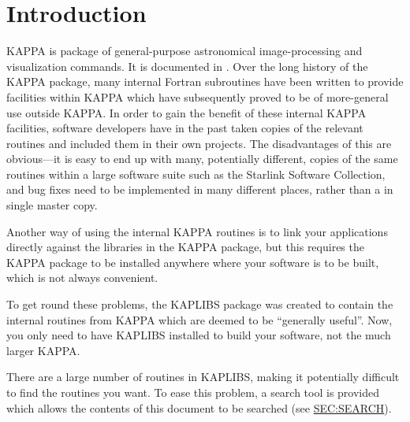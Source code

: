 \stardocabstract
 \newpage
 \begin{latexonly}
   \setlength{\parskip}{0mm}
   \latexonlytoc
   \setlength{\parskip}{\medskipamount}
   \markright{\stardocname}
 \end{latexonly}
\cleardoublepage
\renewcommand{\thepage}{\arabic{page}}
\setcounter{page}{1}

\section {Introduction}

KAPPA is package of general-purpose astronomical image-processing and
visualization commands. It is documented in . Over
the long history of the KAPPA package, many internal Fortran subroutines
have been written to provide facilities within KAPPA which have
subsequently proved to be of more-general use outside KAPPA. In order to
gain the benefit of these internal KAPPA facilities, software developers
have in the past taken copies of the relevant routines and included them
in their own projects. The disadvantages of this are obvious---it is easy
to end up with many, potentially different, copies of the same routines
within a large software suite such as the Starlink Software Collection,
and bug fixes need to be implemented in many different places, rather
than a in single master copy.

Another way of using the internal KAPPA routines is to link your
applications directly against the libraries in the KAPPA package, but
this requires the KAPPA package to be installed anywhere where your
software is to be built, which is not always convenient.

To get round these problems, the KAPLIBS package was created to
contain the internal routines from KAPPA which are deemed to be
``generally useful''. Now, you only need to have KAPLIBS installed to
build your software, not the much larger KAPPA.

There are a large number of routines in KAPLIBS, making it potentially
difficult to find the routines you want. To ease this problem, a search
tool is provided which allows the contents of this document to be
searched (see \hyperref{here}{Section~}{}{SEC:SEARCH}).

